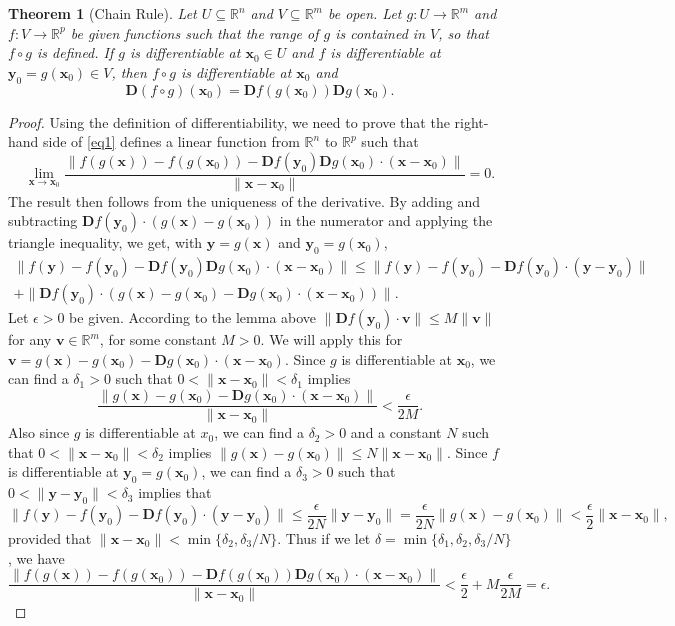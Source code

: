 \documentclass[12pt,letterpaper]{article}
\newtheorem{theorem}{Theorem}[section]
\newcommand{\R}{\mathbb{R}}
\newcommand{\D}{\mathbf{D}}
\newcommand{\x}{\mathbf{x}}
\newcommand{\y}{\mathbf{y}}
\begin{document}
\newpage
\begin{theorem}[Chain Rule]
Let $U\subseteq \R^n$ and $V\subseteq \R^m$ be open. Let $g:U\to \R^m$ and $f:V\to \R^p$ be given functions such that the range of $g$ is contained in $V$, so that $f\circ g$ is defined. If $g$ is differentiable at $\mathbf{x}_0\in U$ and $f$ is differentiable at $\mathbf{y}_0=g(\mathbf{x}_0)\in V$, then $f\circ g$ is differentiable at $\mathbf{x}_0$ and 
\begin{equation}\label{eq1}
\mathbf{D}(f\circ g)(\mathbf{x}_0) = \D f(g(\x_0))\D g(\x_0).
\end{equation}
\end{theorem}
\begin{proof}
Using the definition of differentiability, we need to prove that the right-hand side of \eqref{eq1} defines a linear function from $\R^n$ to $\R^p$ such that
\[
\lim_{\x\to\x_0}\frac{\lVert f(g(\x))-f(g(\x_0))-\D f(\mathbf{y}_0)\D g(\x_0)\cdot (\x-\x_0)\rVert}{\lVert \x-\x_0\rVert} = 0.
\]
The result then follows from the uniqueness of the derivative. By adding and subtracting $\D f(\mathbf{y}_0)\cdot (g(\x)-g(\x_0))$ in the numerator and applying the triangle inequality, we get, with $\mathbf{y} = g(\x)$ and $\mathbf{y}_0 = g(\x_0)$,
\begin{multline*}
\lVert f(\mathbf{y})-f(\mathbf{y}_0)-\D f(\mathbf{y}_0)\D g(\x_0)\cdot (\x-\x_0)\rVert\leq \lVert f(\y)-f(\y_0)-\D f(\y_0)\cdot (\y-\y_0)\rVert\\
+\lVert \D f(\y_0)\cdot (g(\x)-g(\x_0)-\D g(\x_0)\cdot (\x-\x_0))\rVert.
\end{multline*}
Let $\epsilon>0$ be given. 
According to the lemma above $\lVert \D f(\y_0)\cdot \mathbf{v}\rVert \leq M\lVert\mathbf{v}\rVert$ for any $\mathbf{v}\in \R^m$, for some constant $M>0$. We will apply this for $\mathbf{v} = g(\x)-g(\x_0)-\D g(\x_0)\cdot (\x-\x_0)$. Since $g$ is differentiable at $\x_0$, we can find a $\delta_1>0$ such that $0< \lVert \x-\x_0\rVert<\delta_1$ implies
\[
\frac{\lVert g(\x)-g(\x_0)-\D g(\x_0)\cdot (\x-\x_0)\rVert}{\lVert \x-\x_0\rVert} < \frac{\epsilon}{2M}.
\]
Also since $g$ is differentiable at $x_0$, we can find a $\delta_2>0$ and a constant $N$ such that $0< \lVert \x-\x_0\rVert<\delta_2$ implies $\lVert g(\x)-g(\x_0)\rVert\leq N\lVert \x-\x_0\rVert$. Since $f$ is differentiable at $\y_0 = g(\x_0)$, we can find a $\delta_3>0$ such that $0<\lVert \y-\y_0\rVert<\delta_3$ implies that
\[
\lVert f(\y)-f(\y_0)-\D f(\y_0)\cdot (\y-\y_0)\rVert \leq \frac{\epsilon}{2N}\lVert \y-\y_0\rVert = \frac{\epsilon}{2N}\lVert g(\x)-g(\x_0)\rVert<\frac{\epsilon}{2}\lVert \x-\x_0\rVert,
\]
provided that $\lVert \x-\x_0\rVert <\min\{\delta_2,\delta_3/N\}$. Thus if we let $\delta = \min\{\delta_1,\delta_2,\delta_3/N\}$, we have
\[
\frac{\lVert f(g(\x))-f(g(\x_0))-\D f(g(\x_0))\D g(\x_0)\cdot (\x-\x_0)\rVert}{\lVert\x-\x_0\rVert} 
< \frac{\epsilon}{2}+M\frac{\epsilon}{2M}=\epsilon.
\]
\end{proof}
\end{document}
